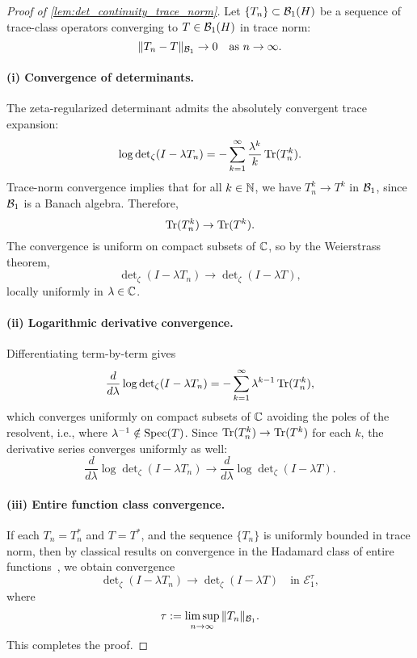 \begin{proof}[Proof of \cref{lem:det_continuity_trace_norm}]
Let \( \{ T_n \} \subset \mathcal{B}_1(H) \) be a sequence of trace-class operators converging to \( T \in \mathcal{B}_1(H) \) in trace norm:
\[
\| T_n - T \|_{\mathcal{B}_1} \to 0 \quad \text{as } n \to \infty.
\]

\paragraph{(i) Convergence of determinants.}
The zeta-regularized determinant admits the absolutely convergent trace expansion:
\[
\log \det\nolimits_\zeta(I - \lambda T_n)
= - \sum_{k=1}^\infty \frac{\lambda^k}{k} \operatorname{Tr}(T_n^k).
\]
Trace-norm convergence implies that for all \( k \in \mathbb{N} \), we have \( T_n^k \to T^k \) in \( \mathcal{B}_1 \), since \( \mathcal{B}_1 \) is a Banach algebra. Therefore,
\[
\operatorname{Tr}(T_n^k) \to \operatorname{Tr}(T^k).
\]
The convergence is uniform on compact subsets of \( \mathbb{C} \), so by the Weierstrass theorem,
\[
\det\nolimits_\zeta(I - \lambda T_n) \to \det\nolimits_\zeta(I - \lambda T),
\]
locally uniformly in \( \lambda \in \mathbb{C} \).

\paragraph{(ii) Logarithmic derivative convergence.}
Differentiating term-by-term gives
\[
\frac{d}{d\lambda} \log \det\nolimits_\zeta(I - \lambda T_n)
= - \sum_{k=1}^\infty \lambda^{k-1} \operatorname{Tr}(T_n^k),
\]
which converges uniformly on compact subsets of \( \mathbb{C} \) avoiding the poles of the resolvent, i.e., where \( \lambda^{-1} \notin \operatorname{Spec}(T) \). Since \( \operatorname{Tr}(T_n^k) \to \operatorname{Tr}(T^k) \) for each \( k \), the derivative series converges uniformly as well:
\[
\frac{d}{d\lambda} \log \det\nolimits_\zeta(I - \lambda T_n)
\to \frac{d}{d\lambda} \log \det\nolimits_\zeta(I - \lambda T).
\]

\paragraph{(iii) Entire function class convergence.}
If each \( T_n = T_n^* \) and \( T = T^* \), and the sequence \( \{ T_n \} \) is uniformly bounded in trace norm, then by classical results on convergence in the Hadamard class of entire functions~\cite[Ch.~1]{Levin1996EntireLectures}, we obtain convergence
\[
\det\nolimits_\zeta(I - \lambda T_n) \to \det\nolimits_\zeta(I - \lambda T)
\quad \text{in } \mathcal{E}_1^\tau,
\]
where
\[
\tau := \limsup_{n \to \infty} \| T_n \|_{\mathcal{B}_1}.
\]
This completes the proof.
\end{proof}
